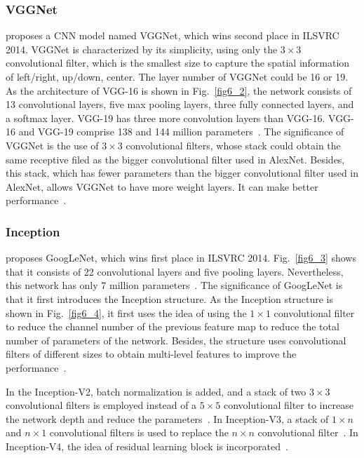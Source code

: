 \subsubsection{VGGNet}
\label{VGGNet}
\cite{Simonyan-2014-VDCN} proposes a CNN model named VGGNet, which wins second place in ILSVRC 2014. VGGNet is characterized by its simplicity, using only the $3\times3$ convolutional filter, which is the smallest size to capture the spatial information of left/right, up/down, center. The layer number of VGGNet could be 16 or 19. As the architecture of VGG-16 is shown in Fig.~\ref{fig6_2}, the network consists of 13 convolutional layers, five max pooling layers, three fully connected layers, and a softmax layer. VGG-19 has three more convolution layers than VGG-16. VGG-16 and VGG-19 comprise 138 and 144 million parameters~\cite{Simonyan-2014-VDCN}. The significance of VGGNet is the use of $3\times3$ convolutional filters, whose stack could obtain the same receptive filed as the bigger convolutional filter used in AlexNet. Besides, this stack, which has fewer parameters than the bigger convolutional filter used in AlexNet, allows VGGNet to have more weight layers. It can make better performance~\cite{Rahaman-2020-ASCC}.




\subsubsection{Inception}
\label{Inception}
\cite{Szegedy-2015-GDC} proposes GoogLeNet, which wins first place in ILSVRC 2014. Fig.~\ref{fig6_3} shows that it consists of 22 convolutional layers and five pooling layers. Nevertheless, this network has only 7 million parameters~\cite{Rahaman-2020-ASCC}. The significance of GoogLeNet is that it first introduces the Inception structure. As the Inception structure is shown in Fig.~\ref{fig6_4}, it first uses the idea of using the $1\times1$ convolutional filter to reduce the channel number of the previous feature map to reduce the total number of parameters of the network. Besides, the structure uses convolutional filters of different sizes to obtain multi-level features to improve the performance~\cite{Zhang-2020-AMCF}.

In the Inception-V2, batch normalization is added, and a stack of two $3\times3$ convolutional filters is employed instead of a $5\times5$ convolutional filter to increase the network depth and reduce the parameters~\cite{Ioffe-2015-BNAD}. In Inception-V3, a stack of $1\times n$ and $n \times1$ convolutional filters is used to replace the $n \times n$ convolutional filter~\cite{Szegedy-2016-RIAC}. In Inception-V4, the idea of residual learning block is incorporated~\cite{Szegedy-2017-IIIR}.



